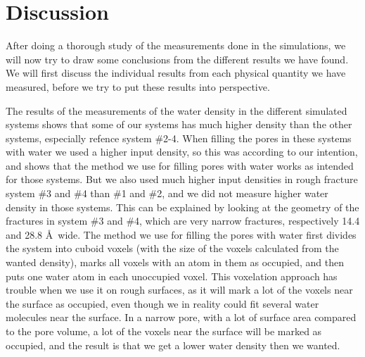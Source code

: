 \section{Discussion\label{sec:discussion}}
After doing a thorough study of the measurements done in the simulations, we will now try to draw some conclusions from the different results we have found. We will first discuss the individual results from each physical quantity we have measured, before we try to put these results into perspective.


The results of the measurements of the water density in the different simulated systems shows that some of our systems has much higher density than the other systems, especially refence system \#2-4. When filling the pores in these systems with water we used a higher input density, so this was according to our intention, and shows that the method we use for filling pores with water works as intended for those systems. But we also used much higher input densities in rough fracture system \#3 and \#4 than \#1 and \#2, and we did not measure higher water density in those systems. This can be explained by looking at the geometry of the fractures in system \#3 and \#4, which are very narrow fractures, respectively 14.4 and 28.8 \AA\ wide. The method we use for filling the pores with water first divides the system into cuboid voxels (with the size of the voxels calculated from the wanted density), marks all voxels with an atom in them as occupied, and then puts one water atom in each unoccupied voxel. This voxelation approach has trouble when we use it on rough surfaces, as it will mark a lot of the voxels near the surface as occupied, even though we in reality could fit several water molecules near the surface. In a narrow pore, with a lot of surface area compared to the pore volume, a lot of the voxels near the surface will be marked as occupied, and the result is that we get a lower water density then we wanted.


